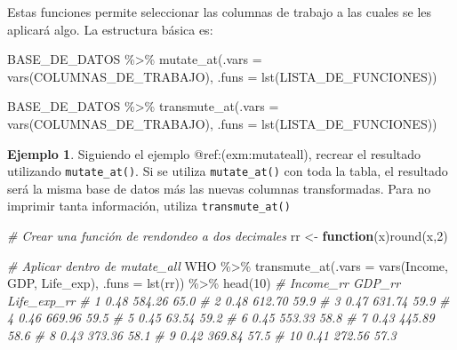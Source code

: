 \documentclass[
]{article}
\newenvironment{Shaded}{\begin{snugshade}}{\end{snugshade}}
\newcommand{\AttributeTok}[1]{\textcolor[rgb]{0.77,0.63,0.00}{#1}}
\newcommand{\CommentTok}[1]{\textcolor[rgb]{0.56,0.35,0.01}{\textit{#1}}}
\newcommand{\ControlFlowTok}[1]{\textcolor[rgb]{0.13,0.29,0.53}{\textbf{#1}}}
\newcommand{\DecValTok}[1]{\textcolor[rgb]{0.00,0.00,0.81}{#1}}
\newcommand{\FunctionTok}[1]{\textcolor[rgb]{0.00,0.00,0.00}{#1}}
\newcommand{\NormalTok}[1]{#1}
\newcommand{\OtherTok}[1]{\textcolor[rgb]{0.56,0.35,0.01}{#1}}
\newcommand{\SpecialCharTok}[1]{\textcolor[rgb]{0.00,0.00,0.00}{#1}}
\theoremstyle{definition}
\theoremstyle{definition}
\newtheorem{example}{Ejemplo}[section]
\theoremstyle{definition}
\theoremstyle{definition}
\theoremstyle{remark}
\begin{document}
Estas funciones permite seleccionar las columnas de trabajo a las cuales se les aplicará algo. La estructura básica es:

\begin{Shaded}
\begin{Highlighting}[]
\NormalTok{BASE\_DE\_DATOS }\SpecialCharTok{\%\textgreater{}\%} 
  \FunctionTok{mutate\_at}\NormalTok{(}\AttributeTok{.vars =} \FunctionTok{vars}\NormalTok{(COLUMNAS\_DE\_TRABAJO),}
            \AttributeTok{.funs =} \FunctionTok{lst}\NormalTok{(LISTA\_DE\_FUNCIONES))}

\NormalTok{BASE\_DE\_DATOS }\SpecialCharTok{\%\textgreater{}\%} 
  \FunctionTok{transmute\_at}\NormalTok{(}\AttributeTok{.vars =} \FunctionTok{vars}\NormalTok{(COLUMNAS\_DE\_TRABAJO),}
            \AttributeTok{.funs =} \FunctionTok{lst}\NormalTok{(LISTA\_DE\_FUNCIONES))}
\end{Highlighting}
\end{Shaded}

\begin{example}

Siguiendo el ejemplo @ref:(exm:mutateall), recrear el resultado utilizando \texttt{mutate\_at()}. Si se utiliza \texttt{mutate\_at()} con toda la tabla, el resultado será la misma base de datos más las nuevas columnas transformadas. Para no imprimir tanta información, utiliza \texttt{transmute\_at()}

\begin{Shaded}
\begin{Highlighting}[]
\CommentTok{\# Crear una función de rendondeo a dos decimales}
\NormalTok{rr }\OtherTok{\textless{}{-}} \ControlFlowTok{function}\NormalTok{(x)}\FunctionTok{round}\NormalTok{(x,}\DecValTok{2}\NormalTok{)}

\CommentTok{\# Aplicar dentro de mutate\_all}
\NormalTok{WHO }\SpecialCharTok{\%\textgreater{}\%} 
  \FunctionTok{transmute\_at}\NormalTok{(}\AttributeTok{.vars =} \FunctionTok{vars}\NormalTok{(Income, GDP, Life\_exp),}
            \AttributeTok{.funs =} \FunctionTok{lst}\NormalTok{(rr)) }\SpecialCharTok{\%\textgreater{}\%} 
  \FunctionTok{head}\NormalTok{(}\DecValTok{10}\NormalTok{)}
\CommentTok{\#    Income\_rr GDP\_rr Life\_exp\_rr}
\CommentTok{\# 1       0.48 584.26        65.0}
\CommentTok{\# 2       0.48 612.70        59.9}
\CommentTok{\# 3       0.47 631.74        59.9}
\CommentTok{\# 4       0.46 669.96        59.5}
\CommentTok{\# 5       0.45  63.54        59.2}
\CommentTok{\# 6       0.45 553.33        58.8}
\CommentTok{\# 7       0.43 445.89        58.6}
\CommentTok{\# 8       0.43 373.36        58.1}
\CommentTok{\# 9       0.42 369.84        57.5}
\CommentTok{\# 10      0.41 272.56        57.3}
\end{Highlighting}
\end{Shaded}

\end{example}
\end{document}
